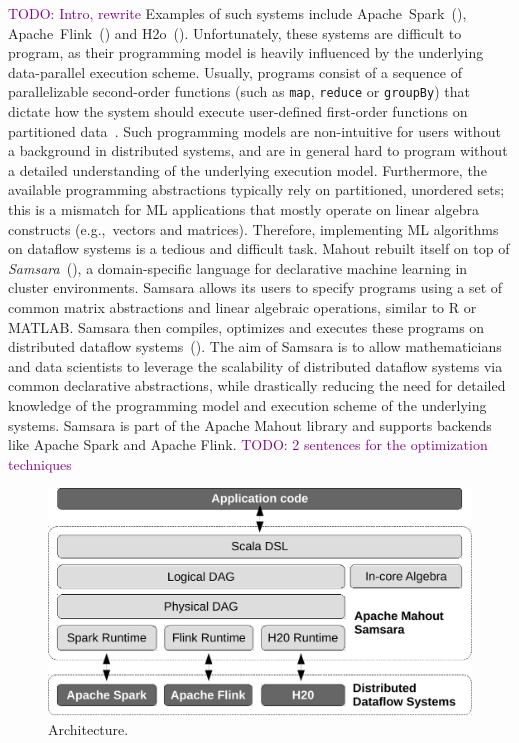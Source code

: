 \documentclass[twoside,11pt]{article}
\newcommand{\todo}[1]{\textcolor{purple}{TODO: #1}}
\begin{document}
\todo{Intro, rewrite} Examples of such systems include Apache~Spark~(\cite{Zaharia2012}), Apache~Flink~(\cite{Alexandrov2014}) and H2o~(\cite{H2O}). Unfortunately, these systems are difficult to program, as their programming model is heavily influenced by the underlying data-parallel execution scheme. Usually, programs consist of a sequence of parallelizable second-order functions (such as \texttt{map}, \texttt{reduce} or \texttt{groupBy}) that dictate how the system should execute user-defined first-order functions on partitioned data~\cite{Zaharia2012}. Such programming models are non-intuitive for users without a background in distributed systems, and are in general hard to program without a detailed understanding of the underlying execution model. Furthermore, the available programming abstractions typically rely on partitioned, unordered sets; this is a mismatch for ML applications that mostly operate on linear algebra constructs (e.g.,~vectors and matrices). Therefore, implementing ML algorithms on dataflow systems is a tedious and difficult task. Mahout rebuilt itself on top of \emph{Samsara}~(\cite{Lyubimov2016}), a domain-specific language for declarative machine learning in cluster environments. Samsara allows its users to specify programs using a set of common matrix abstractions and linear algebraic operations, similar to R or MATLAB. Samsara then compiles, optimizes and executes these programs on distributed dataflow systems~(\cite{Schelter2016}). The aim of Samsara is to allow mathematicians and data scientists to leverage the scalability of distributed dataflow systems via common declarative abstractions, while drastically reducing the need for detailed knowledge of the programming model and execution scheme of the underlying systems. Samsara is part of the Apache Mahout library and supports backends like Apache Spark and Apache Flink. \todo{2 sentences for the optimization techniques}\\ 
%
\begin{figure}
  \begin{center}
    \includegraphics[scale=0.33]{figures/architecture-crop}
    \caption{Architecture.\label{fig:architecture}}
  \end{center}
\end{figure}
\end{document}
